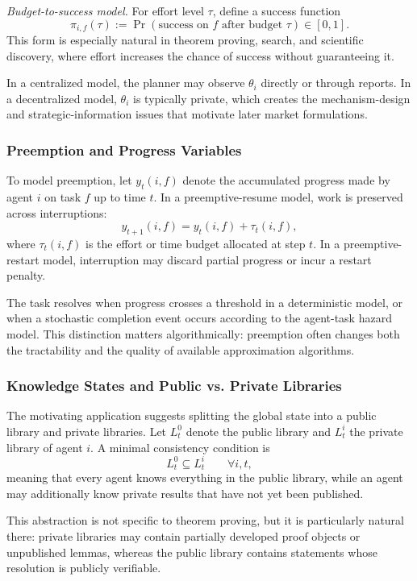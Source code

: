\textit{Budget-to-success model.}
For effort level \(\tau\), define a success function
\[
  \pi_{i,f}(\tau)
  :=
  \Pr(\text{success on } f \text{ after budget } \tau)
  \in [0,1].
\]
This form is especially natural in theorem proving, search, and scientific discovery, where effort increases the chance of success without guaranteeing it.

In a centralized model, the planner may observe \(\theta_i\) directly or through reports. In a decentralized model, \(\theta_i\) is typically private, which creates the mechanism-design and strategic-information issues that motivate later market formulations.

\subsubsection{Preemption and Progress Variables}

To model preemption, let \(y_t(i,f)\) denote the accumulated progress made by agent \(i\) on task \(f\) up to time \(t\). In a preemptive-resume model, work is preserved across interruptions:
\[
  y_{t+1}(i,f) = y_t(i,f) + \tau_t(i,f),
\]
where \(\tau_t(i,f)\) is the effort or time budget allocated at step \(t\). In a preemptive-restart model, interruption may discard partial progress or incur a restart penalty.

The task resolves when progress crosses a threshold in a deterministic model, or when a stochastic completion event occurs according to the agent-task hazard model. This distinction matters algorithmically: preemption often changes both the tractability and the quality of available approximation algorithms.

\subsubsection{Knowledge States and Public vs. Private Libraries}

The motivating application suggests splitting the global state into a public library and private libraries. Let \(L_t^0\) denote the public library and \(L_t^i\) the private library of agent \(i\). A minimal consistency condition is
\[
  L_t^0 \subseteq L_t^i
  \qquad
  \forall i,t,
\]
meaning that every agent knows everything in the public library, while an agent may additionally know private results that have not yet been published.

This abstraction is not specific to theorem proving, but it is particularly natural there: private libraries may contain partially developed proof objects or unpublished lemmas, whereas the public library contains statements whose resolution is publicly verifiable.

